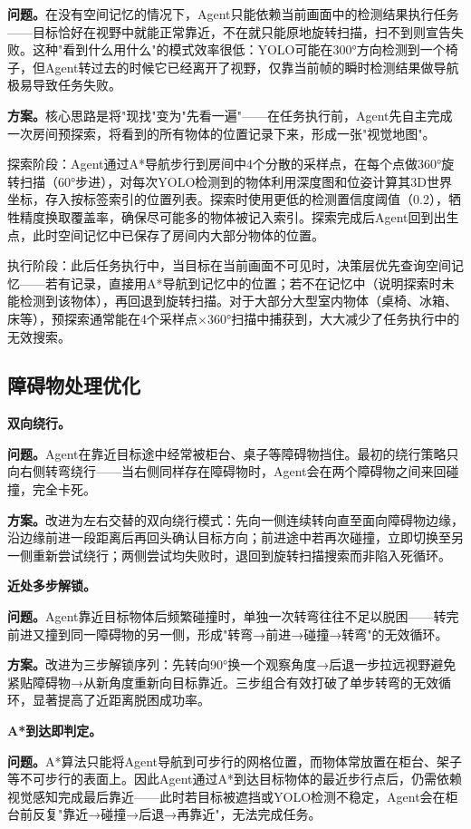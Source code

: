 \documentclass{SYSUReport}
\begin{document}
\textbf{问题。}在没有空间记忆的情况下，Agent只能依赖当前画面中的检测结果执行任务——目标恰好在视野中就能正常靠近，不在就只能原地旋转扫描，扫不到则宣告失败。这种"看到什么用什么"的模式效率很低：YOLO可能在300°方向检测到一个椅子，但Agent转过去的时候它已经离开了视野，仅靠当前帧的瞬时检测结果做导航极易导致任务失败。

\textbf{方案。}核心思路是将"现找"变为"先看一遍"——在任务执行前，Agent先自主完成一次房间预探索，将看到的所有物体的位置记录下来，形成一张"视觉地图"。

探索阶段：Agent通过A*导航步行到房间中4个分散的采样点，在每个点做360°旋转扫描（60°步进），对每次YOLO检测到的物体利用深度图和位姿计算其3D世界坐标，存入按标签索引的位置列表。探索时使用更低的检测置信度阈值（0.2），牺牲精度换取覆盖率，确保尽可能多的物体被记入索引。探索完成后Agent回到出生点，此时空间记忆中已保存了房间内大部分物体的位置。

执行阶段：此后任务执行中，当目标在当前画面不可见时，决策层优先查询空间记忆——若有记录，直接用A*导航到记忆中的位置；若不在记忆中（说明探索时未能检测到该物体），再回退到旋转扫描。对于大部分大型室内物体（桌椅、冰箱、床等），预探索通常能在4个采样点×360°扫描中捕获到，大大减少了任务执行中的无效搜索。

\subsection{障碍物处理优化}

\textbf{双向绕行。}

\textbf{问题。}Agent在靠近目标途中经常被柜台、桌子等障碍物挡住。最初的绕行策略只向右侧转弯绕行——当右侧同样存在障碍物时，Agent会在两个障碍物之间来回碰撞，完全卡死。

\textbf{方案。}改进为左右交替的双向绕行模式：先向一侧连续转向直至面向障碍物边缘，沿边缘前进一段距离后再回头确认目标方向；前进途中若再次碰撞，立即切换至另一侧重新尝试绕行；两侧尝试均失败时，退回到旋转扫描搜索而非陷入死循环。

\textbf{近处多步解锁。}

\textbf{问题。}Agent靠近目标物体后频繁碰撞时，单独一次转弯往往不足以脱困——转完前进又撞到同一障碍物的另一侧，形成"转弯→前进→碰撞→转弯"的无效循环。

\textbf{方案。}改进为三步解锁序列：先转向90°换一个观察角度→后退一步拉远视野避免紧贴障碍物→从新角度重新向目标靠近。三步组合有效打破了单步转弯的无效循环，显著提高了近距离脱困成功率。

\textbf{A*到达即判定。}

\textbf{问题。}A*算法只能将Agent导航到可步行的网格位置，而物体常放置在柜台、架子等不可步行的表面上。因此Agent通过A*到达目标物体的最近步行点后，仍需依赖视觉感知完成最后靠近——此时若目标被遮挡或YOLO检测不稳定，Agent会在柜台前反复"靠近→碰撞→后退→再靠近"，无法完成任务。
\end{document}
